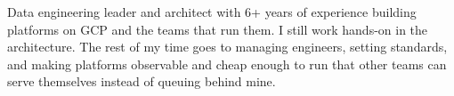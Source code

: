 \documentclass{template/silvia-resume}
\begin{document}
\ResumeLeadershipLayout

Data engineering leader and architect with 6+ years of experience building platforms on GCP and the teams that run them. I still work hands-on in the architecture. The rest of my time goes to managing engineers, setting standards, and making platforms observable and cheap enough to run that other teams can serve themselves instead of queuing behind mine.
\vspace{8pt}

\LeadershipSkills
\vspace{8pt}


\PlaytomicLeadRole
\begin{ResumeBullets}
  \PlaytomicLeadership
  \PlaytomicMcpSemanticLayerLead
  \PlaytomicMcpAdoption
  \PlaytomicSelfServeFrameworkLead
  \PlaytomicStreamingImpact
  \PlaytomicAdkAgents
\end{ResumeBullets}

\PlaytomicSeniorRole
\begin{ResumeBullets}
  \PlaytomicIngestion
  \PlaytomicBeamFramework
  \PlaytomicTerraform
  \PlaytomicObservability
\end{ResumeBullets}

\SiftiaRole
\begin{ResumeBullets}
  \SiftiaLeadership
  \SiftiaQueryRefactor
  \SiftiaRefreshTime
  \SiftiaReportingAndMigration
\end{ResumeBullets}

\newpage
{}

\WorkyRole
\begin{ResumeBullets}
  \WorkyWarehouse
\end{ResumeBullets}

\MatchCraftRole
\begin{ResumeBullets}
  \MatchCraftImpact
\end{ResumeBullets}

\MmiRole
\begin{ResumeBullets}
  \MmiLeadership
  \MmiStandards
\end{ResumeBullets}

\BMetricsRole
\begin{ResumeBullets}
  \BMetricsImpact
\end{ResumeBullets}
\end{document}
